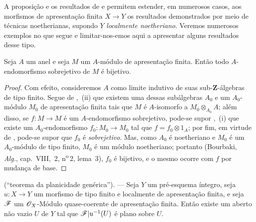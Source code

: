 \begin{env}[8.9.2]
\label{IV.8.9.2}
A proposição  e os resultados de  e  permitem estender, em numerosos casos, aos morfismos de apresentação finita $X\to Y$ os resultados demonstrados por meio de técnicas noetherianas, supondo $Y$ \emph{localmente noetheriano}.
Veremos numerosos exemplos no que segue e limitar-nos-emos aqui a apresentar alguns resultados desse tipo.
\end{env}

\begin{proposition}[8.9.3]
\label{IV.8.9.3}
Seja $A$ um anel e seja $M$ um $A$-módulo de apresentação finita.
Então todo $A$-endomorfismo sobrejetivo de $M$ é bijetivo.
\end{proposition}

\begin{proof}
Com efeito, consideremos $A$ como limite indutivo de suas sub-$\mathbf{Z}$-álgebras de tipo finito.
Segue de ,~(ii) que existem uma dessas subálgebras $A_0$ e um $A_0$-módulo $M_0$ de apresentação finita tais que $M$ é $A$-isomorfo a $M_0\otimes_{A_0}A$; além disso, se $f:M\to M$ é um $A$-endomorfismo sobrejetivo, pode-se supor ,~(i) que existe um $A_0$-endomorfismo $f_0:M_0\to M_0$ tal que $f=f_0\otimes 1_A$; por fim, em virtude de , pode-se supor que $f_0$ é \emph{sobrejetivo}.
Mas, como $A_0$ é noetheriano e $M_0$ é um $A_0$-módulo de tipo finito, $M_0$ é um módulo noetheriano; portanto (Bourbaki, \emph{Alg.}, cap.~VIII, \textsection\,2, n\textsuperscript{o}\,2, lema~3), $f_0$ é bijetivo, e o mesmo ocorre com $f$ por mudança de base.
\end{proof}

\begin{proposition}[8.9.4]
\label{IV.8.9.4}
(``teorema da planicidade genérica''). --- Seja $Y$ um pré-esquema íntegro, seja $u:X\to Y$ um morfismo de tipo finito e localmente de apresentação finita, e seja $\mathscr{F}$ um $\mathscr{O}_X$-Módulo quase-coerente de apresentação finita.
Então existe um aberto não vazio $U$ de $Y$ tal que $\mathscr{F}|u^{-1}(U)$ é plano sobre $U$.
\end{proposition}


